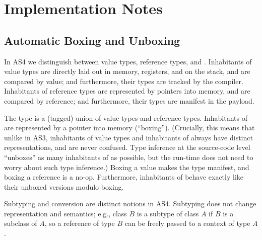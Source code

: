 



\section{Implementation Notes}
\label{impl}
\subsection{Automatic Boxing and Unboxing}

In AS4 we distinguish between value types, reference types, and \code{*}.
Inhabitants of value types are directly
laid out in memory, registers, and on the stack, and are compared by
value; and furthermore, their types are tracked by the compiler.
Inhabitants of reference types are represented by pointers into memory, and are
compared by reference; and furthermore,  their types are manifest in
the payload.

The \code{*} type is a (tagged) union of value types and reference
types. Inhabitants of \code{*} are represented by a pointer into
memory (``boxing''). (Crucially, this means that unlike in AS3,
inhabitants of value types and inhabitants of \code{*} always have
distinct representations, and are never confused. Type inference at
the source-code level ``unboxes'' as many inhabitants of \code{*} as
possible, but the run-time does not need to worry about such type inference.)
Boxing a value makes the type manifest, and boxing a reference is a
no-op. Furthermore, inhabitants of \code{*} behave exactly like their unboxed versions modulo boxing.

Subtyping and conversion are distinct notions in AS4. Subtyping
	does not change representation and semantics;
	e.g., class $B$ is a subtype of class $A$ if $B$ is a subclass
        of $A$, so a reference of type $B$ can be freely passed to a
        context of type $A$.


